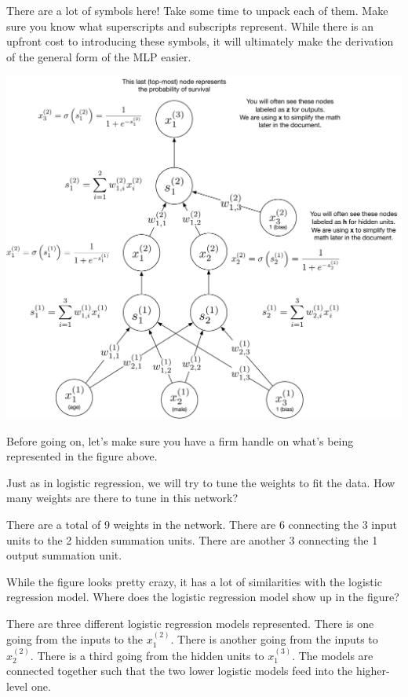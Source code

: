 \documentclass[assignment06_Solutions]{subfiles}
\begin{document}
\begin{notice}
There are a lot of symbols here!  Take some time to unpack each of them.  Make sure you know what superscripts and subscripts represent.  While there is an upfront cost to introducing these symbols, it will ultimately make the derivation of the general form of the MLP easier.
\end{notice}
\includegraphics[width=\linewidth]{figures/titanicmlp}

\vspace{1em}

\begin{exercise}[(10 minutes)]
Before going on, let's make sure you have a firm handle on what's being represented in the figure above.
\bes
\item Just as in logistic regression, we will try to tune the weights to fit the data.  How many weights are there to tune in this network?
\begin{boxedsolution}
There are a total of 9 weights in the network.  There are 6 connecting the 3 input units to the 2 hidden summation units.  There are another 3 connecting the 1 output summation unit.
\end{boxedsolution}
\item While the figure looks pretty crazy, it has a lot of similarities with the logistic regression model.  Where does the logistic regression model show up in the figure?
\begin{boxedsolution}
There are three different logistic regression models represented.  There is one going from the inputs to the $x_1^{(2)}$.  There is another going from the inputs to $x_2^{(2)}$.  There is a third going from the hidden units to $x_1^{(3)}$.  The models are connected together such that the two lower logistic models feed into the higher-level one.
\end{boxedsolution}
\ees
\end{exercise}
\end{document}
